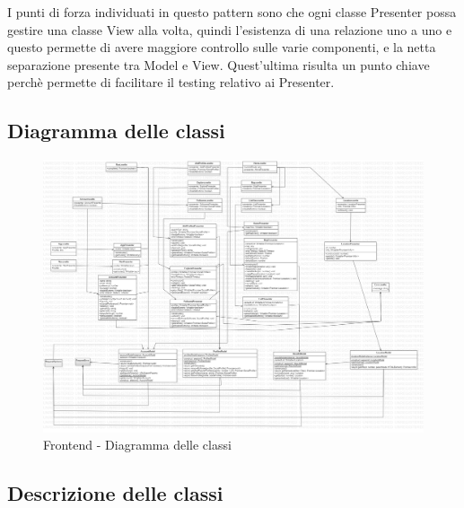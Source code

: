 I punti di forza individuati in questo pattern sono che ogni classe Presenter possa gestire 
una classe View alla volta, quindi l'esistenza di una relazione uno a uno e questo permette di avere maggiore 
controllo sulle varie componenti, e la netta separazione presente tra Model e View. 
Quest'ultima risulta un punto chiave perchè permette di facilitare il testing relativo ai Presenter.

\subsection{Diagramma delle classi}
\begin{figure}[!h]
    \includegraphics[width=16cm]{sezioni/images/Main.jpg}
    \centering
    \caption{Frontend - Diagramma delle classi}
\end{figure}

\subsection{Descrizione delle classi}
